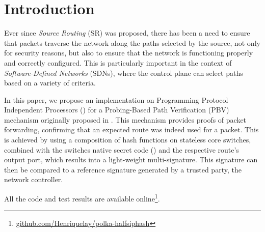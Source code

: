 \section{Introduction}


Ever since \textit{Source Routing} (SR) was proposed, there has been a need to ensure that packets traverse the network along the paths selected by the source, not only for security reasons, but also to ensure that the network is functioning 
properly
and correctly configured. This is particularly important in the context of \textit{Software-Defined Networks} (SDNs), where the control plane can select paths based on a variety of criteria\cite{SRSDN}.

In this paper, we propose an implementation on Programming Protocol Independent Processors (\pIV) for 
a Probing-Based Path Verification (PBV) mechanism originally proposed in \pathsec\cite{pathsec}. This mechanism provides proofs of packet forwarding, confirming that an expected route was indeed used for a packet.
This is achieved by using a composition of hash functions on stateless core switches, 
combined with the switches native secret code (\nodeids) and the respective route's output port, which results into a light-weight multi-signature. This signature  can then be compared
to a reference signature generated by a trusted party, the network controller. 

All the code and test results are available online\footnote{\url{github.com/Henriquelay/polka-halfsiphash}}.
